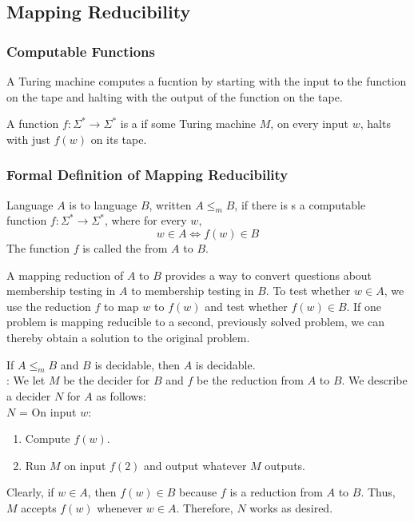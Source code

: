 \documentclass{article}
\begin{document}
\subsection{Mapping Reducibility}

\subsubsection{Computable Functions}

A Turing machine computes a fucntion by starting with the input to the function on the tape and halting with the output of the function on the tape. 

\begin{definition}
  A function $f: \Sigma^{*} \rightarrow \Sigma^{*}$ is a  if some Turing machine $M$, on every input $w$, halts with just $f(w)$ on its tape. 
\end{definition}

\subsubsection{Formal Definition of Mapping Reducibility}

\begin{definition}
  Language $A$ is  to language $B$, written $A \leq_{m} B$, if there is s a computable function $f: \Sigma^{*} \rightarrow \Sigma^{*}$, where for every $w$, $$w \in A \Leftrightarrow f(w) \in B$$ The function $f$ is called the  from $A$ to $B$.
\end{definition}

A mapping reduction of $A$ to $B$ provides a way to convert questions about membership testing in $A$ to membership testing in $B$. To test whether $w \in A$, we use the reduction $f$ to map $w$ to $f(w)$ and test whether $f(w) \in B$. If one problem is mapping reducible to a second, previously solved problem, we can thereby obtain a solution to the original problem. 

\begin{theorem}
  If $A \leq_{m} B$ and $B$ is decidable, then $A$ is decidable. \\ 
  : We let $M$ be the decider for $B$ and $f$ be the reduction from $A$ to $B$. We describe a decider $N$ for $A$ as follows: \\ 
  $N$ = On input $w$: 
  \begin{enumerate}
    \item Compute $f(w)$. 
    \item Run $M$ on input $f(2)$ and output whatever $M$ outputs. 
  \end{enumerate}
  Clearly, if $w \in A$, then $f(w) \in B$ because $f$ is a reduction from $A$ to $B$. Thus, $M$ accepts $f(w)$ whenever $w \in A$. Therefore, $N$ works as desired. 
\end{theorem}
\end{document}
